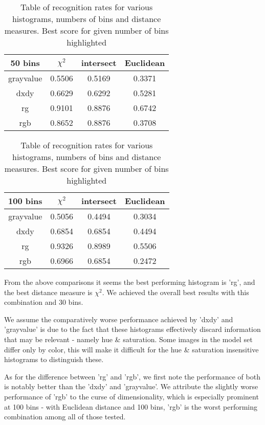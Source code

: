 \documentclass{article}
\begin{document}
\begin{table}[h!]
\vspace*{0.6 cm}

\begin{tabular}{|c| c c c|} 
\hline 
\textbf{50 bins} & $\chi^2$ & intersect & Euclidean \\ [0.5ex] 
\hline\hline
grayvalue & 0.5506 & 0.5169 & 0.3371 \\
dxdy & 0.6629 & 0.6292 & 0.5281 \\
rg & \cellcolor[HTML]{B0D0B0} 0.9101 & 0.8876 & 0.6742 \\
rgb & 0.8652 & 0.8876 & 0.3708 \\
\hline
\end{tabular}

\vspace*{0.6 cm}

\begin{tabular}{|c| c c c|} 
\hline 
\textbf{100 bins} & $\chi^2$ & intersect & Euclidean \\ [0.5ex] 
\hline\hline
grayvalue & 0.5056 & 0.4494 & 0.3034 \\
dxdy & 0.6854 & 0.6854 & 0.4494 \\
rg & \cellcolor[HTML]{B0D0B0} 0.9326 & 0.8989 & 0.5506 \\
rgb & 0.6966 & 0.6854 & 0.2472 \\
\hline
\end{tabular}


\caption{Table of recognition rates for various histograms, numbers of bins and distance measures. Best score for given number of bins highlighted}
\end{table}

From the above comparisons it seems the best performing histogram is 'rg', and the best distance measure is $\chi^2$. We achieved the overall best results with this combination and 30 bins. 

We assume the comparatively worse performance achieved by 'dxdy' and 'grayvalue' is due to the fact that these histograms effectively discard information that may be relevant - namely hue \& saturation. Some images in the model set differ only by color, this will make it difficult for the hue \& saturation insensitive histograms to distinguish these.

As for the difference between 'rg' and 'rgb', we first note the performance of both is notably better than the 'dxdy' and 'grayvalue'. We attribute the slightly worse performance of 'rgb' to the curse of dimensionality, which is especially prominent at 100 bins - with Euclidean distance and 100 bins, 'rgb' is the worst performing combination among all of those tested.
\end{document}
